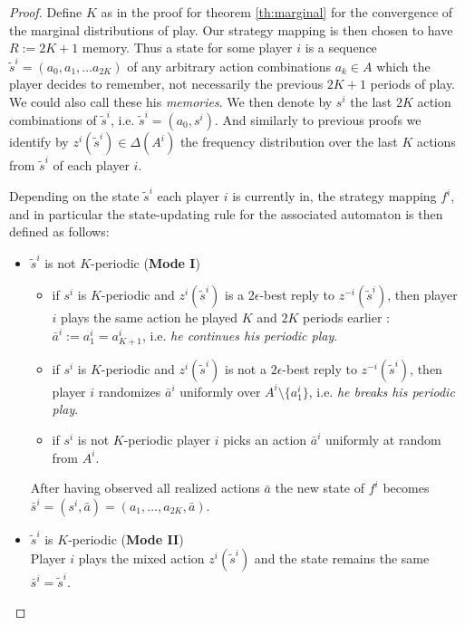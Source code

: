 \documentclass[a4paper]{article}
\theoremstyle{plain}
\theoremstyle{remark}
\begin{document}
\begin{proof}
	Define $K$ as in the proof for theorem \ref{th:marginal} for the convergence of the marginal
	distributions of play. Our strategy mapping is then chosen to have $R := 2K + 1$ memory.
	Thus a state for some player $i$ is a sequence $\tilde{s}^i = (a_0, a_1, ... a_{2K})$ of any arbitrary action combinations $a_k \in A$
	which the player decides to remember, not necessarily the previous $2K+1$ periods of play. We could also call these his \emph{memories}.
	We then denote by $s^i$ the last $2K$ action combinations of $\tilde{s}^i$, i.e. $\tilde{s}^i = (a_0, s^i)$.
	And similarly to previous proofs we identify by $z^i(\tilde{s}^i) \in \Delta(A^i)$ the frequency distribution over the
	last $K$ actions from $\tilde{s}^i$ of each player $i$.
	
	\medskip
	Depending on the state $\tilde{s}^i$  each player $i$ is currently in, the strategy mapping $f^i$, and 
	in particular the state-updating rule for the associated automaton is then defined as follows:
	
	\begin{itemize}
		\item $\tilde{s}^i$ is not $K$-periodic ({\bf Mode I})
		\begin{itemize}
			\item	if $s^i$ is $K$-periodic and $z^i(\tilde{s}^i)$ is a $2\epsilon$-best reply to $z^{-i}(\tilde{s}^i)$, 
			then player $i$ plays the same action he played $K$ and $2K$ periods earlier : $\bar{a}^i := a^i_1 = a^i_{K+1}$,
			i.e. \emph{he continues his periodic play}.
			
			\item if $s^i$ is $K$-periodic and $z^i(\tilde{s}^i)$ is not a $2\epsilon$-best reply to $z^{-i}(\tilde{s}^i)$,
			then player $i$ randomizes $\bar{a}^i$ uniformly over $A^i \setminus \{a^i_1\}$,
			i.e. \emph{he breaks his periodic play}.
			
			\item if $s^i$ is not $K$-periodic player $i$ picks an action $\bar{a}^i$ uniformly at random from $A^i$.
		\end{itemize}
		After having observed all realized actions $\bar{a}$ the new state of $f^i$ becomes
		$\bar{s}^i = (s^i, \bar{a}) = (a_1, ..., a_{2K}, \bar{a})$.
			
		\item $\tilde{s}^i$ is $K$-periodic ({\bf Mode II})\\
			Player $i$ plays the mixed action $z^i(\tilde{s}^i)$ and the state remains the same $\bar{s}^i = \tilde{s}^i$.
		

\end{itemize}
\end{proof}
\end{document}
